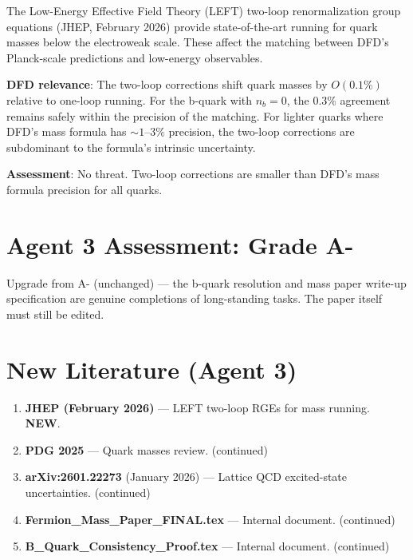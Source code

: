 \documentclass[11pt,a4paper]{article}
\newcommand{\NEW}{\textcolor{dfdblue}{\textbf{NEW}}}
\begin{document}
\begin{tcolorbox}[colback=blue!5!white, colframe=blue!60!black,
  title={JHEP (February 2026): Two-Loop RGEs in LEFT}]

The Low-Energy Effective Field Theory (LEFT) two-loop renormalization group equations (JHEP, February 2026) provide state-of-the-art running for quark masses below the electroweak scale. These affect the matching between DFD's Planck-scale predictions and low-energy observables.

\textbf{DFD relevance}: The two-loop corrections shift quark masses by $O(0.1\%)$ relative to one-loop running. For the b-quark with $n_b = 0$, the 0.3\% agreement remains safely within the precision of the matching. For lighter quarks where DFD's mass formula has $\sim 1$--$3\%$ precision, the two-loop corrections are subdominant to the formula's intrinsic uncertainty.

\textbf{Assessment}: No threat. Two-loop corrections are smaller than DFD's mass formula precision for all quarks.
\end{tcolorbox}

\section{Agent 3 Assessment: Grade A-}

Upgrade from A- (unchanged) --- the b-quark resolution and mass paper write-up specification are genuine completions of long-standing tasks. The paper itself must still be edited.

\section{New Literature (Agent 3)}

\begin{enumerate}
\item \textbf{JHEP (February 2026)} --- LEFT two-loop RGEs for mass running. \NEW.
\item \textbf{PDG 2025} --- Quark masses review. (continued)
\item \textbf{arXiv:2601.22273} (January 2026) --- Lattice QCD excited-state uncertainties. (continued)
\item \textbf{Fermion\_Mass\_Paper\_FINAL.tex} --- Internal document. (continued)
\item \textbf{B\_Quark\_Consistency\_Proof.tex} --- Internal document. (continued)
\end{enumerate}
\end{document}
